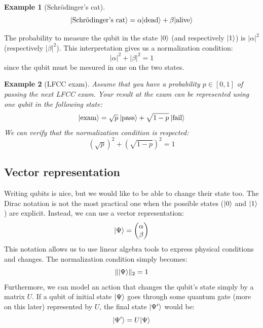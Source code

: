 \documentclass[12pt,a4paper]{article}
\theoremstyle{plain}
\newtheorem*{example}{Example}
\theoremstyle{definition}
\DeclarePairedDelimiter\ket{\lvert}{\rangle}
\begin{document}
\begin{example}[Schrödinger's cat]
    \begin{equation*}
        \ket{\textnormal{Schrödinger's cat}} = \alpha\ket{\textnormal{dead}} + \beta\ket{\textnormal{alive}}
    \end{equation*}
\end{example}

The probability to measure the qubit in the state $\ket{0}$ (and respectively $\ket{1}$) is $|\alpha|^2$ (respectively $|\beta|^2$). This interpretation gives us a normalization condition:
\begin{equation*}
    |\alpha|^2+|\beta|^2=1
\end{equation*}
since the qubit must be mesured in one on the two states.

\begin{example}[LFCC exam]
    Assume that you have a probability $p\in[0, 1]$ of passing the next LFCC exam. Your result at the exam can be represented using one qubit in the following state:
    \begin{equation*}
        \ket{\textnormal{exam}} = \sqrt{p} \: \ket{\textnormal{pass}}+\sqrt{1-p} \: \ket{\textnormal{fail}}
    \end{equation*}
    We can verify that the normalization condition is respected:
    \begin{equation*}
        (\sqrt{p})^2 + (\sqrt{1-p})^2 = 1
    \end{equation*}
\end{example}

\subsection{Vector representation}
Writing qubits is nice, but we would like to be able to change their state too. The Dirac notation is not the most practical one when the possible states ($\ket{0}$ and $\ket{1}$) are explicit. Instead, we can use a vector representation:
\begin{equation*}
    \ket{\Psi} = \begin{pmatrix}\alpha\\\beta\end{pmatrix}
\end{equation*}
This notation allows us to use linear algebra tools to express physical conditions and changes. The normalization condition simply becomes:
\begin{equation*}
    \|\ket{\Psi}\|_2 = 1
\end{equation*}
Furthermore, we can model an action that changes the qubit's state simply by a matrix $U$. If a qubit of initial state $\ket{\Psi}$ goes through some quantum gate (more on this later) represented by $U$, the final state $\ket{\Psi'}$ would be:
\begin{equation*}
    \ket{\Psi'} = U\ket{\Psi}
\end{equation*}
\end{document}
